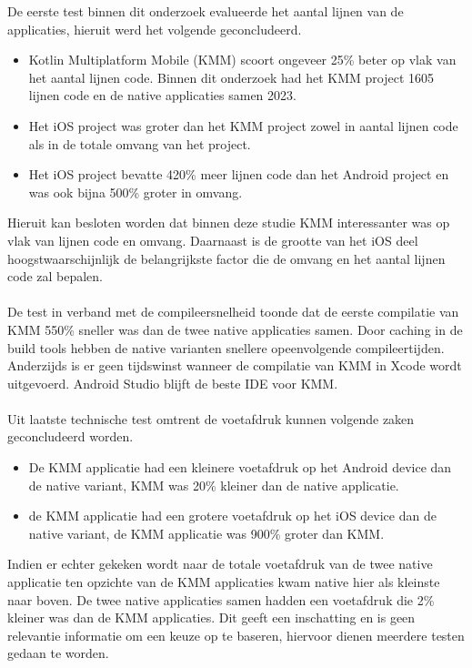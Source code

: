 De eerste test binnen dit onderzoek evalueerde het aantal lijnen van de applicaties, hieruit werd het volgende geconcludeerd.
\begin{itemize}
    \item Kotlin Multiplatform Mobile (KMM) scoort ongeveer 25\% beter op vlak van het aantal lijnen code. Binnen dit onderzoek had het KMM project 1605 lijnen code en de native applicaties samen 2023.
    \item Het iOS project was groter dan het KMM project zowel in aantal lijnen code als in de totale omvang van het project.
    \item Het iOS project bevatte 420\% meer lijnen code dan het Android project en was ook bijna 500\% groter in omvang.
\end{itemize}
Hieruit kan besloten worden dat binnen deze studie KMM interessanter was op vlak van lijnen code en omvang. Daarnaast is de grootte van het iOS deel hoogstwaarschijnlijk de belangrijkste factor die de omvang en het aantal lijnen code zal bepalen.
\\ \\ 
De test in verband met de compileersnelheid toonde dat de eerste compilatie van KMM 550\% sneller was dan de twee native applicaties samen. Door caching in de build tools hebben de native varianten snellere opeenvolgende compileertijden. Anderzijds is er geen tijdswinst wanneer de compilatie van KMM in Xcode wordt uitgevoerd. Android Studio blijft de beste IDE voor KMM.
\\ \\ 
Uit laatste technische test omtrent de voetafdruk kunnen volgende zaken geconcludeerd worden.
\begin{itemize}
    \item De KMM applicatie had een kleinere voetafdruk op het Android device dan de native variant, KMM was 20\% kleiner dan de native applicatie.
    \item de KMM applicatie had een grotere voetafdruk op het iOS device dan de native variant, de KMM applicatie was 900\% groter dan KMM.
\end{itemize}
Indien er echter gekeken wordt naar de totale voetafdruk van de twee native applicatie ten opzichte van de KMM applicaties kwam native hier als kleinste naar boven. De twee native applicaties samen hadden een voetafdruk die 2\% kleiner was dan de KMM applicaties. Dit geeft een inschatting en is geen relevantie informatie om een keuze op te baseren, hiervoor dienen meerdere testen gedaan te worden.
\\ \\
